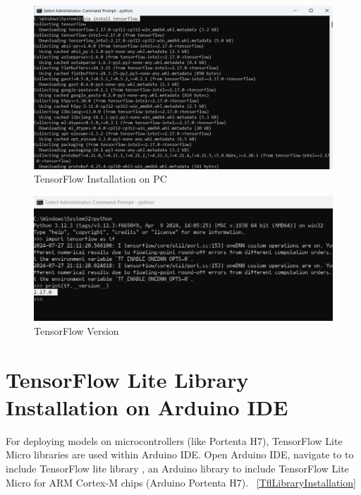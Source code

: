 \begin{figure}
	\begin{center}
		\includegraphics[width=0.7\linewidth]{Images/TensorFlowLite/TensorFlowInstallation.png}
		\caption{TensorFlow Installation on PC}
		\label{TflInstallation}
	\end{center}
\end{figure}

\begin{figure}
	\begin{center}
		\includegraphics[width=0.7\linewidth]{Images/TensorFlowLite/TensorFlowVersion.png}
		\caption{TensorFlow Version}
		\label{TflVersion}
	\end{center}
\end{figure}

\section{TensorFlow Lite Library Installation on Arduino IDE}

For deploying models on microcontrollers (like Portenta H7), TensorFlow Lite Micro libraries are used within Arduino IDE. Open Arduino IDE, navigate to  to include TensorFlow lite library , an Arduino library to include TensorFlow Lite Micro for ARM Cortex-M chips (Arduino Portenta H7). ~\ref{TflLibraryInstallation}

